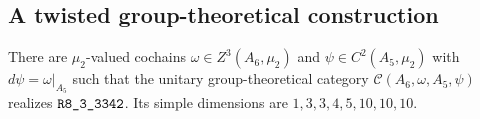 \subsection{A twisted group-theoretical construction}
\begin{theorem}\label{thm:m3-twisted-a6}
There are $\mu_2$-valued cochains $\omega\in Z^3(A_6,\mu_2)$ and
$\psi\in C^2(A_5,\mu_2)$ with $d\psi=\omega|_{A_5}$ such that the
unitary group-theoretical category
$\mathcal C(A_6,\omega,A_5,\psi)$ realizes $\sha{R8_3_3342}$.
Its simple dimensions are $1,3,3,4,5,10,10,10$.
\end{theorem}
